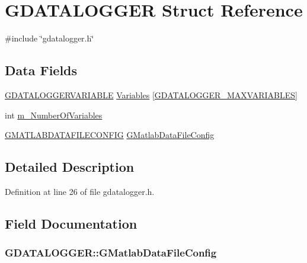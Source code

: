\hypertarget{structGDATALOGGER}{\section{G\-D\-A\-T\-A\-L\-O\-G\-G\-E\-R Struct Reference}
\label{structGDATALOGGER}
}


{\ttfamily \#include \char`\"{}gdatalogger.\-h\char`\"{}}

\subsection*{Data Fields}
\begin{DoxyCompactItemize}
\item 
\hyperlink{structGDATALOGGERVARIABLE}{G\-D\-A\-T\-A\-L\-O\-G\-G\-E\-R\-V\-A\-R\-I\-A\-B\-L\-E} \hyperlink{structGDATALOGGER_a6af9584d8665205b950cb2dcc5f90a94}{Variables} \mbox{[}\hyperlink{gdatalogger_8h_a2ddc529b6734b7a9222a5fbd1305581e}{G\-D\-A\-T\-A\-L\-O\-G\-G\-E\-R\-\_\-\-M\-A\-X\-V\-A\-R\-I\-A\-B\-L\-E\-S}\mbox{]}
\item 
int \hyperlink{structGDATALOGGER_a2ac727ee6c50f7e04030cbe531158f08}{m\-\_\-\-Number\-Of\-Variables}
\item 
\hyperlink{structGMATLABDATAFILECONFIG}{G\-M\-A\-T\-L\-A\-B\-D\-A\-T\-A\-F\-I\-L\-E\-C\-O\-N\-F\-I\-G} \hyperlink{structGDATALOGGER_a062fd3836dbd0b1bec129ab372bff04a}{G\-Matlab\-Data\-File\-Config}
\end{DoxyCompactItemize}


\subsection{Detailed Description}


Definition at line 26 of file gdatalogger.\-h.



\subsection{Field Documentation}
\hypertarget{structGDATALOGGER_a062fd3836dbd0b1bec129ab372bff04a}{
\subsubsection[{G\-Matlab\-Data\-File\-Config}]{ G\-D\-A\-T\-A\-L\-O\-G\-G\-E\-R\-::\-G\-Matlab\-Data\-File\-Config}}\label{structGDATALOGGER_a062fd3836dbd0b1bec129ab372bff04a}


